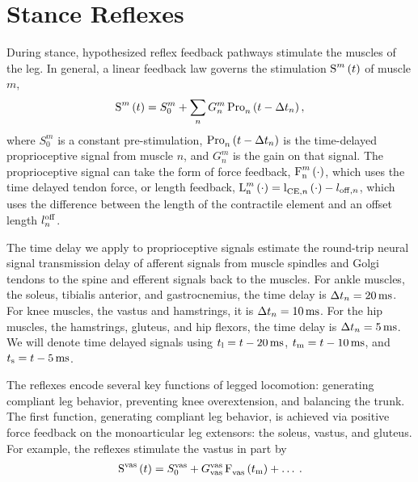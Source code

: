 \section{Stance Reflexes}\label{sec:neuro_stance_reflexes}

During stance, hypothesized reflex feedback pathways stimulate the muscles of
the leg. In general, a linear feedback law governs the stimulation
$\func{S}[][m]{t}$ of muscle $m$, 
\begin{align}
    \func{S}[][m]{t} = S_0^m + \sum_n G_n^m \func{Pro}[n][]{t - \Delta t_n},
    \label{eq:lin_reflex}
\end{align}
where $S_0^m$ is a constant pre-stimulation, $\func{Pro}[n][]{t - \Delta t_n}$
is the time-delayed proprioceptive signal from muscle $n$, and $G_n^m$ is the
gain on that signal. The proprioceptive signal can take the form of force
feedback, $\func{F}[\tn{n}][m]{\cdot}$, which uses the time delayed tendon
force, or length feedback, $\func{L}[\tn{n}][m]{\cdot} =
\func{l}[\tn{CE},n][]{\cdot} - l_{\tn{off}, n}$, which uses the difference
between the length of the contractile element and an offset length
$l_n^{\mathrm{off}}$.

The time delay we apply to proprioceptive signals estimate the round-trip neural
signal transmission delay of afferent signals from muscle spindles and Golgi
tendons to the spine and efferent signals back to the muscles. For ankle
muscles, the soleus, tibialis anterior, and gastrocnemius, the time delay is
$\Delta t_n = \unit[20]{ms}$. For knee muscles, the vastus and hamstrings, it is
$\Delta t_n = \unit[10]{ms}$. For the hip muscles, the hamstrings, gluteus, and
hip flexors, the time delay is $\Delta t_n = \unit[5]{ms}$. We will denote time
delayed signals using $t_\tn{l} = t - \unit[20]{ms}$, $t_\tn{m} = t -
\unit[10]{ms}$, and $t_\tn{s} = t - \unit[5]{ms}$.


The reflexes encode several key functions of legged locomotion: generating
compliant leg behavior, preventing knee overextension, and balancing the trunk.
The first function, generating compliant leg behavior, is achieved via positive
force feedback on the monoarticular leg extensors: the soleus, vastus, and
gluteus. For example, the reflexes stimulate the vastus in part by
\begin{align}
    \func{S}[][\tn{vas}]{t} = S_0^\tn{vas} + 
        G_\tn{vas}^\tn{vas} \func{F}[\tn{vas}][]{t_\tn{m}} + \ldots \:.
\end{align}

